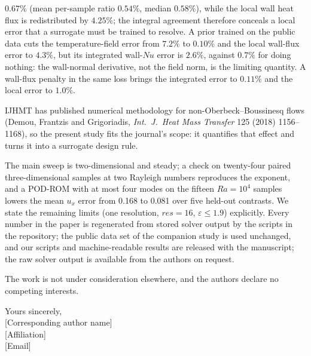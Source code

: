 \documentclass[11pt]{article}
\begin{document}
\begin{itemize}
$0.67\%$ (mean per-sample ratio $0.54\%$, median $0.58\%$), while the local wall heat flux is
redistributed by $4.25\%$; the integral agreement
therefore conceals a local error that a surrogate must be trained to resolve. A prior trained on
the public data cuts the temperature-field error from $7.2\%$ to $0.10\%$ and the local wall-flux
error to $4.3\%$, but its integrated wall-$Nu$ error is $2.6\%$, against $0.7\%$ for doing
nothing: the wall-normal derivative, not the field norm, is the limiting quantity. A wall-flux
penalty in the same loss brings the integrated error to $0.11\%$ and the local error to $1.0\%$.
\end{itemize}

\noindent
IJHMT has published numerical methodology for non-Oberbeck--Boussinesq flows (Demou, Frantzis and
Grigoriadis, \emph{Int.\ J.\ Heat Mass Transfer} 125 (2018) 1156--1168), so the present study fits
the journal's scope: it quantifies that effect and turns it into a surrogate design rule.

\noindent
The main sweep is two-dimensional and steady; a check on twenty-four paired three-dimensional samples at
two Rayleigh numbers reproduces the exponent, and a POD-ROM with at most four modes on the fifteen
$Ra=10^4$ samples lowers the mean $u_x$ error from 0.168 to 0.081 over five held-out contrasts. We
state the remaining limits (one resolution, $res=16$, $\varepsilon\le1.9$) explicitly. Every number in
the paper is regenerated from stored solver output by the scripts in the repository; the public
data set of the companion study is used unchanged, and our scripts and machine-readable results are
released with the manuscript; the raw solver output is available from the authors on request.

\noindent
The work is not under consideration elsewhere, and the authors declare no competing interests.

\vspace{2pt}
\noindent
Yours sincerely,\\
{[Corresponding author name]}\\
{[Affiliation]}\\
{[Email]}
\end{document}
